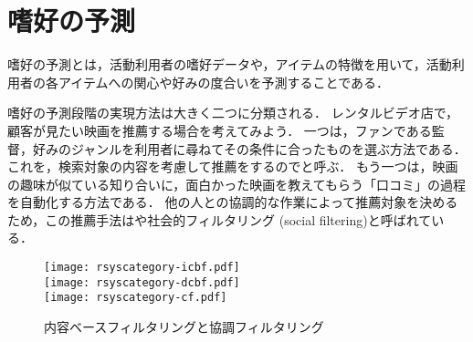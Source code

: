 \chapter{嗜好の予測}
\label{chap:process}

嗜好の予測とは，活動利用者の嗜好データや，アイテムの特徴を用いて，活動利用者の各アイテムへの関心や好みの度合いを予測することである．

嗜好の予測段階の実現方法は大きく二つに分類される．
レンタルビデオ店で，顧客が見たい映画を推薦する場合を考えてみよう．
一つは，ファンである監督，好みのジャンルを利用者に尋ねてその条件に合ったものを選ぶ方法である．
これを，検索対象の内容を考慮して推薦をするのでと呼ぶ．
もう一つは，映画の趣味が似ている知り合いに，面白かった映画を教えてもらう「口コミ」の過程を自動化する方法である．
他の人との協調的な作業によって推薦対象を決めるため，この推薦手法はや社会的フィルタリング (social filtering)と呼ばれている．

\begin{figure}
\centering
{}%
{\texttt{[image: rsyscategory-icbf.pdf]}}\\\medskip
{}%
{\texttt{[image: rsyscategory-dcbf.pdf]}}\\\medskip
{}%
{\texttt{[image: rsyscategory-cf.pdf]}}
\caption{内容ベースフィルタリングと協調フィルタリング}
\label{fig:cfcbf}
\end{figure}

